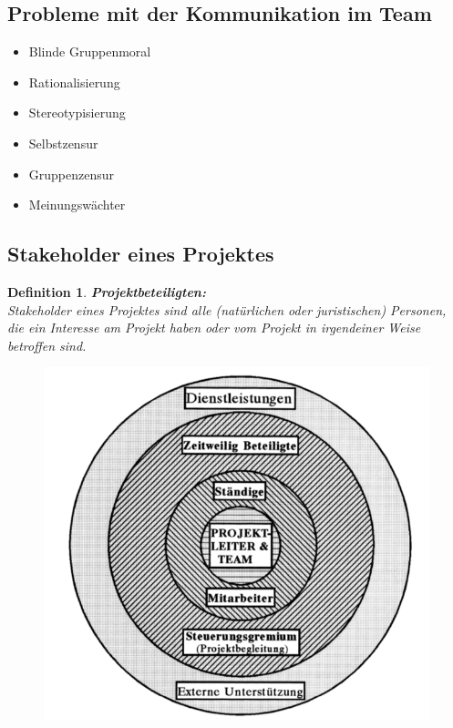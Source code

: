 \documentclass[11pt,a4paper]{article}
\newenvironment{de}[1]
{\begin{mdframed}[style=de]\begin{mydef}{\textbf{#1:}}\\} 
{\end{mydef}\end{mdframed}}
\newtheorem{mydef}{Definition}
\begin{document}
\subsection{Probleme mit der Kommunikation im Team}
\begin{itemize}
\item Blinde Gruppenmoral
\item Rationalisierung
\item Stereotypisierung
\item Selbstzensur
\item Gruppenzensur
\item Meinungswächter
\end{itemize}

\subsection{Stakeholder eines Projektes}
\begin{de}{Projektbeteiligten}

Stakeholder eines Projektes sind alle (natürlichen oder juristischen)
Personen, die ein Interesse am Projekt haben oder vom Projekt in
irgendeiner Weise betroffen sind.

\end{de}

\begin{figure}[H]
\centering
\includegraphics[scale=0.35]{ch5/stakeholder}
\end{figure}
\end{document}
